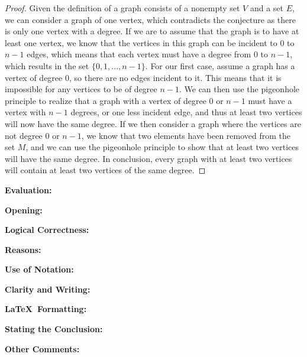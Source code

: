 \documentclass[11pt,titlepage]{article}		%
\def\rubric{\textbf{Evaluation:} \makebox[0.75in]{\hrulefill}

\vspace{.3in}

\textbf{Opening:} \makebox[0.75in]{\hrulefill}

\vspace{.3in}

\textbf{Logical Correctness:} \makebox[0.75in]{\hrulefill}

\vspace{.3in}

\textbf{Reasons:} \makebox[0.75in]{\hrulefill}

\vspace{.3in}

\textbf{Use of Notation:} \makebox[0.75in]{\hrulefill}

\vspace{.3in}

\textbf{Clarity and Writing:} \makebox[0.75in]{\hrulefill}

\vspace{.3in}

\textbf{\LaTeX\ Formatting:} \makebox[0.75in]{\hrulefill}

\vspace{.3in}

\textbf{Stating the Conclusion:} \makebox[0.75in]{\hrulefill}

\vspace{.3in}

\textbf{Other Comments:}

\vspace{1in}

}
\theoremstyle{definition}
\theoremstyle{theorem}
\begin{document}
\begin{proof}
    Given the definition of a graph consists of a nonempty set $V$ and a set $E$, we can consider a graph of one vertex, which contradicts the conjecture as there is only one vertex with a degree. 
    If we are to assume that the graph is to have at least one vertex, we know that the vertices in this graph can be incident to $0$ to $n-1$ edges, which means that each vertex must have a degree from $0$ to $n-1$, which results in the set $\{0,1,...,n-1\}$.
    For our first case, assume a graph has a vertex of degree $0$, so there are no edges incident to it. This means that it is impossible for any vertices to be of degree $n-1$.
    We can then use the pigeonhole principle to realize that a graph with a vertex of degree $0$ or $n-1$ must have a vertex with $n-1$ degrees, or one less incident edge, and thus at least two vertices will now have the same degree.
    If we then consider a graph where the vertices are not degree $0$ or $n-1$, we know that two elements have been removed from the set $M$, and we can use the pigeonhole principle to show that at least two vertices will have the same degree.
    In conclusion, every graph with at least two vertices will contain at least two vertices of the same degree.
\end{proof}

\rubric
\end{document}
